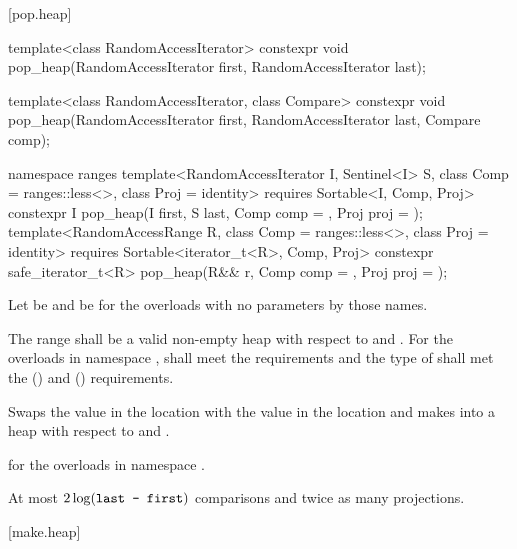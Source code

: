[pop.heap]{}

%
\begin{itemdecl}
template<class RandomAccessIterator>
  constexpr void pop_heap(RandomAccessIterator first, RandomAccessIterator last);

template<class RandomAccessIterator, class Compare>
  constexpr void pop_heap(RandomAccessIterator first, RandomAccessIterator last,
                          Compare comp);

namespace ranges {
  template<RandomAccessIterator I, Sentinel<I> S, class Comp = ranges::less<>,
      class Proj = identity>
    requires Sortable<I, Comp, Proj>
    constexpr I
      pop_heap(I first, S last, Comp comp = {}, Proj proj = {});
  template<RandomAccessRange R, class Comp = ranges::less<>, class Proj = identity>
    requires Sortable<iterator_t<R>, Comp, Proj>
    constexpr safe_iterator_t<R>
      pop_heap(R&& r, Comp comp = {}, Proj proj = {});
}
\end{itemdecl}

\begin{itemdescr}
\pnum
Let  be 
and  be 
for the overloads with no parameters by those names.

\pnum
\requires
The range
shall be a valid non-empty heap with respect to  and .
For the overloads in namespace ,
 shall meet the
 requirements and
the type of  shall met the
 () and
 () requirements.

\pnum
\effects
Swaps the value in the location 
with the value in the location
and makes
into a heap with respect to  and .

\pnum
\returns
{} for the overloads in namespace .

\pnum
\complexity
At most
$2 \log(\texttt{last - first})$
comparisons and twice as many projections.
\end{itemdescr}

[make.heap]{}

